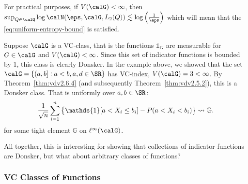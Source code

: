 \begin{remark*}
	For practical purposes, if \(V(\calG) < \infty\), then \(\sup_{Q\in\calQ}\log\calN(\eps,\calG,L_2(Q)) \lesssim \log\left(\frac{1}{\eps}\right)\) which will mean that the \eqref{eq:uniform-entropy-bound} is satisfied. 
\end{remark*}

\begin{example*}
	Suppose \(\calG\) is a VC-class, that is the functions \(\mathds{1}_G\) are measurable for \(G \in \calG\) and \(V(\calG) <\infty\). Since this set of indicator functions is bounded by 1, this class is clearly Donsker. In the example above, we showed that the set \(\calG = \{(a,b]: a< b, a,d \in \SR\}\) has VC-index, \(V(\calG) = 3 < \infty\). By Theorem~\ref{thm:vdv2.6.4} (and subsequently Theorem~\ref{thm:vdv2.5.2}), this is a Donsker class. That is uniformly over \(a,b\in\SR\):
	\[
		\frac{1}{\sqrt{n}}\sum_{i=1}^n \left\{\mathds{1}[a < X_i \leq b_i] - P(a < X_i < b_i)\right\} \wcov \mathbb{G}
	.\] 
	for some tight element \(\mathbb{G}\) on \(\ell^\infty(\calG)\).
\end{example*}

All together, this is interesting for showing that collections of indicator functions are Donsker, but what about arbitrary classes of functions?

\subsubsection{VC Classes of Functions}

